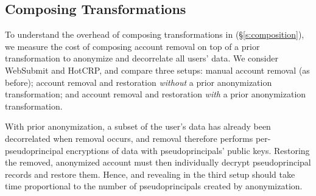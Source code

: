 %
%
%

\subsection{Composing \Xxing Transformations}
\label{s:eval-composition}

%
To understand the overhead of composing transformations in \sys (\S\ref{s:composition}), we measure the
cost of composing account removal on top of
a prior \xxing transformation to anonymize and decorrelate all users' data.
%
We consider WebSubmit and HotCRP, and compare three setups: \one{} manual
account removal (as before); \two{} account removal and restoration
\emph{without} a prior anonymization \xxing transformation; and \three{} account
removal and restoration \emph{with} a prior anonymization \xxing transformation.
%

%
With prior anonymization, a subset of the user's data has already been
decorrelated when removal occurs, and removal therefore performs
per-pseudoprincipal encryptions of \xxed data with pseudoprincipals' public
keys. 
%
%
Restoring the removed, anonymized account must then individually decrypt
pseudoprincipal records and restore them.
%
Hence, \xxing and revealing in the third setup should take time proportional to
the number of pseudoprincipals created by anonymization.
%

